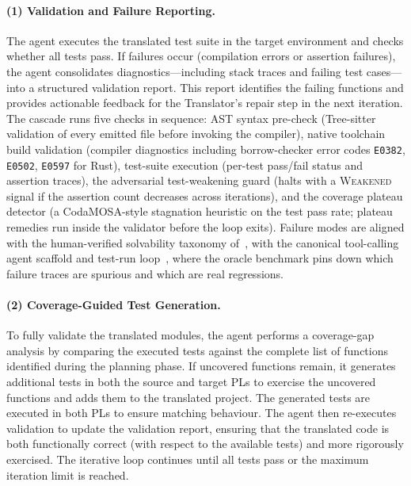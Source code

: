 \paragraph{(1) Validation and Failure Reporting.}
The agent executes the translated test suite in the target environment
and checks whether all tests pass. If failures occur (compilation
errors or assertion failures), the agent consolidates
diagnostics---including stack traces and failing test cases---into a
structured validation report. This report identifies the failing
functions and provides actionable feedback for the Translator's
repair step in the next iteration. The cascade runs five checks in
sequence: AST syntax pre-check (Tree-sitter validation of every
emitted file before invoking the compiler), native toolchain build
validation (compiler diagnostics including borrow-checker error codes
\texttt{E0382}, \texttt{E0502}, \texttt{E0597} for Rust), test-suite
execution (per-test pass/fail status and assertion traces), the
adversarial test-weakening guard (halts with a \textsc{Weakened}
signal if the assertion count decreases across iterations), and the
coverage plateau detector (a CodaMOSA-style stagnation heuristic on
the test pass rate; plateau remedies run inside the validator before
the loop exits). Failure modes are aligned with the human-verified solvability taxonomy of~\cite{p109_swebench_verified_2024,p111_jimenez_swebench_2024,p118_jimenez_swebench_lite_2024,p119_badertdinov_swerebench_2025}, with the canonical tool-calling agent scaffold and test-run loop~\cite{p112_yang_sweagent_2024}, where the oracle benchmark pins down which failure traces are spurious and which are real regressions.

\paragraph{(2) Coverage-Guided Test Generation.}
To fully validate the translated modules, the agent performs a
coverage-gap analysis by comparing the executed tests against the
complete list of functions identified during the planning phase. If
uncovered functions remain, it generates additional tests in both
the source and target PLs to exercise the uncovered functions and
adds them to the translated project. The generated tests are
executed in both PLs to ensure matching behaviour. The agent then
re-executes validation to update the validation report, ensuring that
the translated code is both functionally correct (with respect to the
available tests) and more rigorously exercised. The iterative loop
continues until all tests pass or the maximum iteration limit is
reached.
